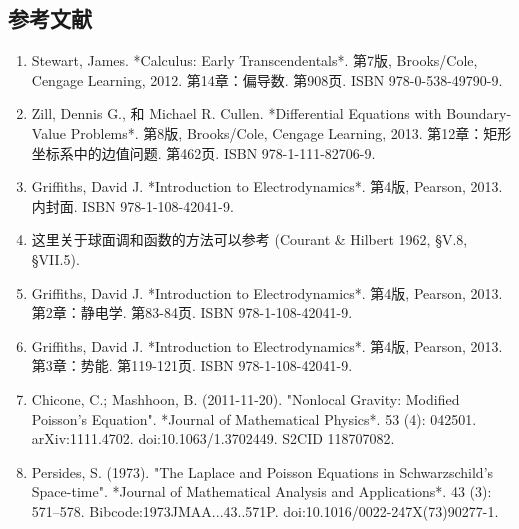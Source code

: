 \subsection{参考文献}  
\begin{enumerate}
\item Stewart, James. *Calculus: Early Transcendentals*. 第7版, Brooks/Cole, Cengage Learning, 2012. 第14章：偏导数. 第908页. ISBN 978-0-538-49790-9.  
\item Zill, Dennis G., 和 Michael R. Cullen. *Differential Equations with Boundary-Value Problems*. 第8版, Brooks/Cole, Cengage Learning, 2013. 第12章：矩形坐标系中的边值问题. 第462页. ISBN 978-1-111-82706-9.  
\item Griffiths, David J. *Introduction to Electrodynamics*. 第4版, Pearson, 2013. 内封面. ISBN 978-1-108-42041-9.  
\item 这里关于球面调和函数的方法可以参考 (Courant & Hilbert 1962, §V.8, §VII.5).  
\item Griffiths, David J. *Introduction to Electrodynamics*. 第4版, Pearson, 2013. 第2章：静电学. 第83-84页. ISBN 978-1-108-42041-9.  
\item Griffiths, David J. *Introduction to Electrodynamics*. 第4版, Pearson, 2013. 第3章：势能. 第119-121页. ISBN 978-1-108-42041-9.  
\item Chicone, C.; Mashhoon, B. (2011-11-20). "Nonlocal Gravity: Modified Poisson's Equation". *Journal of Mathematical Physics*. 53 (4): 042501. arXiv:1111.4702. doi:10.1063/1.3702449. S2CID 118707082.  
\item Persides, S. (1973). "The Laplace and Poisson Equations in Schwarzschild's Space-time". *Journal of Mathematical Analysis and Applications*. 43 (3): 571–578. Bibcode:1973JMAA...43..571P. doi:10.1016/0022-247X(73)90277-1.
\end{enumerate}